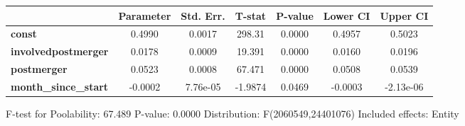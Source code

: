 \documentclass{report}
\begin{document}
\begin{center}
\begin{tabular}{lcccccc}
                             & \textbf{Parameter} & \textbf{Std. Err.} & \textbf{T-stat} & \textbf{P-value} & \textbf{Lower CI} & \textbf{Upper CI}  \\
\midrule
\textbf{const}               &       0.4990       &       0.0017       &      298.31     &      0.0000      &       0.4957      &       0.5023       \\
\textbf{involvedpostmerger}  &       0.0178       &       0.0009       &      19.391     &      0.0000      &       0.0160      &       0.0196       \\
\textbf{postmerger}          &       0.0523       &       0.0008       &      67.471     &      0.0000      &       0.0508      &       0.0539       \\
\textbf{month\_since\_start} &      -0.0002       &      7.76e-05      &     -1.9874     &      0.0469      &      -0.0003      &     -2.13e-06      \\
\bottomrule
\end{tabular}
\end{center}

F-test for Poolability: 67.489 \newline
 P-value: 0.0000 \newline
 Distribution: F(2060549,24401076) \newline
  \newline
 Included effects: Entity
\end{document}
